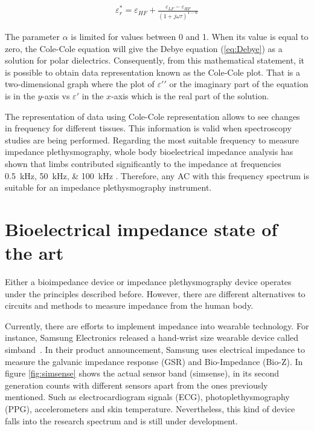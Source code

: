\begin{align}
\label{eq:cole cole}
\varepsilon_r^* = \varepsilon_{HF} + \frac{\varepsilon_{LF} - \varepsilon_{HF}}{(1 + j \omega \tau)^{1-\alpha}}
\end{align}

The parameter $\alpha$ is limited for values between 0 and 1. When its value is equal to zero, the Cole-Cole equation will give the Debye equation (\ref{eq:Debye}) as a solution for polar dielectrics. Consequently, from this mathematical statement, it is possible to obtain data representation known as the Cole-Cole plot. That is a two-dimensional graph where the plot of $\varepsilon \prime\prime$ or the imaginary part of the equation is in the $y$-axis vs $\varepsilon \prime$ in the $x$-axis which is the real part of the solution. 

The representation of data using Cole-Cole representation allows to see changes in frequency for different tissues. This information is valid when spectroscopy studies are being performed. Regarding the most suitable frequency to measure impedance plethysmography, whole body bioelectrical impedance analysis has shown that limbs contributed significantly to the impedance at frequencies \SIlist{0.5; 50; 100}{\kHz} \cite{bracco1996segmental}. Therefore, any AC with this frequency spectrum is suitable for an impedance plethysmography instrument. 

\section{Bioelectrical impedance state of the art} %
\label{section impedance state art}
Either a bioimpedance device or impedance plethysmography device operates under the principles described before. However, there are different alternatives to circuits and methods to measure impedance from the human body.  

Currently, there are efforts to implement impedance into wearable technology. For instance, Samsung Electronics released a hand-wrist size wearable device called simband~\cite{simsense}. In their product announcement, Samsung uses electrical impedance to measure the galvanic impedance response (GSR) and Bio-Impedance (Bio-Z). In figure \ref{fig:simsense} shows the actual sensor band (simsense), in its second generation counts with different sensors apart from the ones previously mentioned. Such as electrocardiogram signals (ECG), photoplethysmography (PPG), accelerometers and skin temperature. Nevertheless, this kind of device falls into the research spectrum and is still under development.

